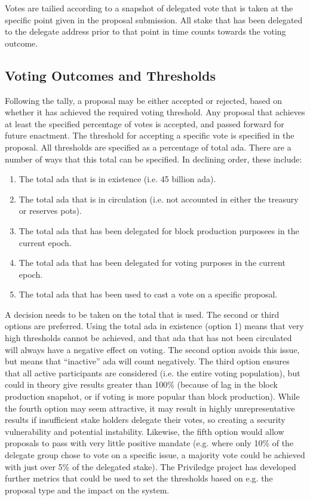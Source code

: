 Votes are tailied according to a snapshot of delegated vote that is taken at the specific point given in the proposal submission. All stake that has been delegated to the delegate address
prior to that point in time counts towards the voting outcome.

\subsection{Voting Outcomes and Thresholds}

Following the tally, a proposal may be either accepted or rejected, based on whether it has achieved the required voting threshold.  Any proposal that achieves at least
the specified percentage of votes is accepted, and passed forward for future enactment.
The threshold for accepting a specific vote is specified in the proposal.
All thresholds are specified as a percentage of total ada.  There are a number of ways that this total can be specified.  In declining order, these include:

\begin{enumerate}
\item
  The total ada that is in existence (i.e. 45 billion ada).
\item
  The total ada that is in circulation (i.e. not accounted in either the treasury or reserves pots).
\item
  The total ada that has been delegated for block production purposees in the current epoch.
\item
  The total ada that has been delegated for voting purposes in the current epoch.
\item
  The total ada that has been used to cast a vote on a specific proposal.
\end{enumerate}

A decision needs to be taken on the total that is used.  The second or third options are preferred.  Using the total ada in existence (option 1) means that very high thresholds cannot be achieved,
and that ada that has not been circulated will always have a negative effect on voting.
The second option avoids this issue, but means that ``inactive'' ada will count negatively.
The third option ensures that all active participants are considered (i.e. the entire voting population), but could in theory give results greater than 100\% (because of lag in the block production
snapshot, or if voting is more popular than block production).   While the fourth option may seem attractive, it may result in highly unrepresentative results if insufficient stake holders delegate
their votes, so creating a security vulnerability and potential instability.
Likewise, the fifth option would allow proposals to pass with very little positive mandate (e.g. where only 10\% of the delegate group chose to vote on a specific issue, a majority vote could be
achieved with just over 5\% of the delegated stake).  The Priviledge project has developed further metrics that could be used to set the thresholds based on e.g. the proposal type and the
impact on the system.
